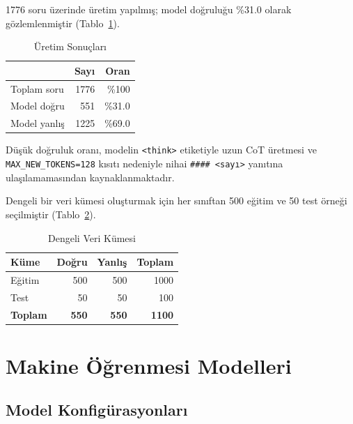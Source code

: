 \documentclass[conference]{IEEEtran}
\begin{document}
1776 soru üzerinde üretim yapılmış; model doğruluğu \%31.0 olarak
gözlemlenmiştir (Tablo~\ref{tab:gen}).

\begin{table}[H]
  \centering
  \caption{Üretim Sonuçları}
  \label{tab:gen}
  \begin{tabular}{lrr}
    \toprule
                          & \textbf{Sayı} & \textbf{Oran} \\
    \midrule
    Toplam soru           & 1776          & \%100  \\
    Model doğru           & 551           & \%31.0 \\
    Model yanlış          & 1225          & \%69.0 \\
    \bottomrule
  \end{tabular}
\end{table}

Düşük doğruluk oranı, modelin \texttt{<think>} etiketiyle uzun CoT üretmesi
ve \texttt{MAX\_NEW\_TOKENS=128} kısıtı nedeniyle nihai \texttt{\#\#\#\# <sayı>}
yanıtına ulaşılamamasından kaynaklanmaktadır.

Dengeli bir veri kümesi oluşturmak için her sınıftan 500 eğitim ve 50 test
örneği seçilmiştir (Tablo~\ref{tab:split}).

\begin{table}[H]
  \centering
  \caption{Dengeli Veri Kümesi}
  \label{tab:split}
  \begin{tabular}{lrrr}
    \toprule
    \textbf{Küme}   & \textbf{Doğru} & \textbf{Yanlış} & \textbf{Toplam} \\
    \midrule
    Eğitim          & 500            & 500             & 1000 \\
    Test            & 50             & 50              & 100  \\
    \textbf{Toplam} & \textbf{550}   & \textbf{550}    & \textbf{1100} \\
    \bottomrule
  \end{tabular}
\end{table}

\section{Makine Öğrenmesi Modelleri}

\subsection{Model Konfigürasyonları}
\end{document}
